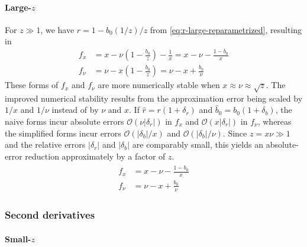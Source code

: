 \documentclass{article}
\begin{document}
\paragraph{Large-$z$}

For $z \gg 1$, we have $r = 1 - b_0(1/z) / z$ from \cref{eq:r-large-reparametrized}, resulting in
%
\begin{align}
  f_x   & = x - \nu (1 - \frac{b_0}{z}) - \frac{1}{x}
  = x - \nu - \frac{1 - b_0}{x}                       \\
  f_\nu & = \nu - x (1 - \frac{b_0}{z})
  = \nu - x + \frac{b_0}{\nu}
\end{align}
%
These forms of $f_x$ and $f_\nu$ are more numerically stable when $x \approx \nu \approx \sqrt{z}$.
The improved numerical stability results from the approximation error being scaled by $1/x$ and $1/\nu$ instead of by $\nu$ and $x$.
If $\hat{r}=r(1+\delta_r)$ and $\hat{b}_0=b_0(1+\delta_b)$, the naive forms incur absolute errors $\mathcal{O}(\nu|\delta_r|)$ in $f_x$ and $\mathcal{O}(x|\delta_r|)$ in $f_\nu$, whereas the simplified forms incur errors $\mathcal{O}(|\delta_b|/x)$ and $\mathcal{O}(|\delta_b|/\nu)$.
Since $z = x\nu \gg 1$ and the relative errors $|\delta_r|$ and $|\delta_b|$ are comparably small, this yields an absolute-error reduction approximately by a factor of $z$.
%
%
\begin{align}\label{eq:first-derivatives-large-z}
  \boxed{
    \begin{aligned}
      f_x   & = x - \nu - \frac{1 - b_0}{x} \\
      f_\nu & = \nu - x + \frac{b_0}{\nu}
    \end{aligned}
  }
\end{align}

\subsubsection{Second derivatives}\label{sec:rician-second-derivatives}

\paragraph{Small-$z$}
\end{document}
